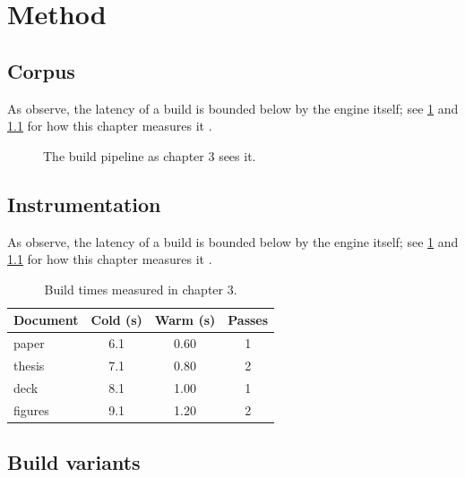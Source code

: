 \chapter{Method}\label{ch:method}

\section{Corpus}\label{sec:method-0}
\lipsum[113-126]

As \textcite{shapiro2011} observe, the latency \latency{} of a build is
bounded below by the engine itself; see \cref{ch:method} and \cref{fig:method}
for how this chapter measures it \parencite{nielsen1993}.

\begin{figure}[t]
  \centering
  \caption{The build pipeline as chapter 3 sees it.}\label{fig:method}
\end{figure}

\section{Instrumentation}\label{sec:method-1}
\lipsum[127-140]

As \textcite{nielsen1993} observe, the latency \latency{} of a build is
bounded below by the engine itself; see \cref{ch:method} and \cref{fig:method}
for how this chapter measures it \parencite{tectonic2024}.

\begin{table}[t]
  \centering
  \begin{tabular}{lSSS}
    \toprule
    Document & {Cold (s)} & {Warm (s)} & {Passes} \\
    \midrule
    paper & 6.1 & 0.60 & 1 \\
    thesis & 7.1 & 0.80 & 2 \\
    deck & 8.1 & 1.00 & 1 \\
    figures & 9.1 & 1.20 & 2 \\
    \bottomrule
  \end{tabular}
  \caption{Build times measured in chapter 3.}\label{tab:method}
\end{table}

\section{Build variants}\label{sec:method-2}
\lipsum[5-18]


